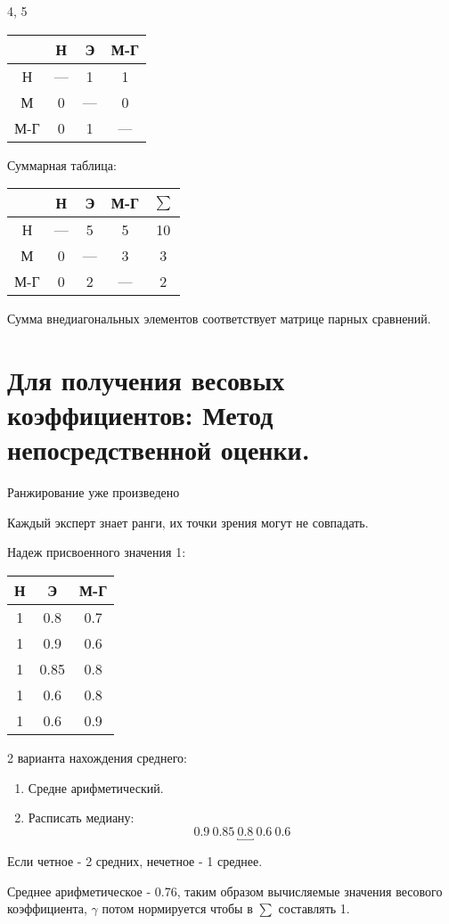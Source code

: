 \documentclass[12pt,a5paper]{scrbook}
\begin{document}
  4, 5

  \begin{tabular}{c|c|c|c}
    & Н & Э & М-Г\\
    \hline
    Н & --- & 1 & 1\\
    М & 0 & --- & 0\\
    М-Г & 0 & 1 & ---
  \end{tabular}

  Суммарная таблица:

  \begin{tabular}{c|c|c|c|c}
    & Н & Э & М-Г & $\sum$\\
    \hline
    Н & --- & 5 & 5 & 10\\
    М & 0 & --- & 3 & 3\\
    М-Г & 0 & 2 & --- & 2
  \end{tabular}

  Сумма внедиагональных элементов соответствует матрице парных сравнений.

  \section{Для получения весовых коэффициентов: Метод непосредственной оценки.}

  Ранжирование уже произведено

  Каждый эксперт знает ранги, их точки зрения могут не совпадать.

  Надеж присвоенного значения 1:

  \begin{tabular}{c|c|c}
    Н & Э & М-Г\\
    \hline
    1 & 0.8 & 0.7\\
    1 & 0.9 & 0.6\\
    1 & 0.85 & 0.8\\
    1 & 0.6 & 0.8\\
    1 & 0.6 & 0.9
  \end{tabular}

  2 варианта нахождения среднего:
  \begin{enumerate}
    \item Средне арифметический.
    \item Расписать медиану:$$0.9 \ 0.85 \ \underbracket{0.8} \ 0.6 \ 0.6$$
  \end{enumerate}

  Если четное - 2 средних, нечетное - 1 среднее.

  Среднее арифметическое - 0.76, таким образом вычисляемые значения весового коэффициента, $\gamma$ потом нормируется чтобы в $\sum$ составлять 1.
\end{document}
